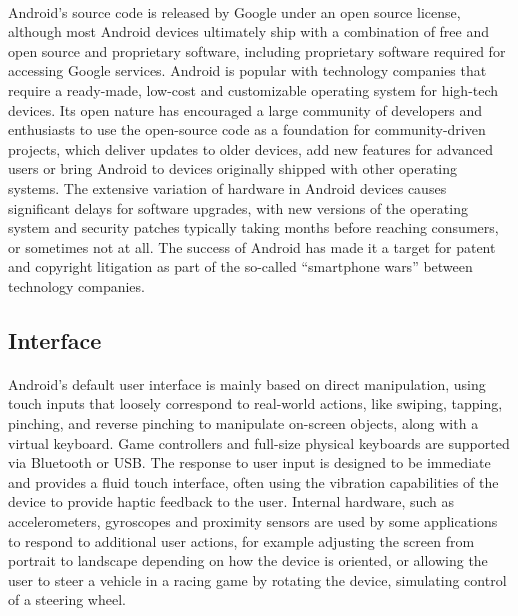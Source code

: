 \documentclass[a4paper,12pt]{report}
\begin{document}
\paragraph{} Android's source code is released by Google under an open source license, although most Android devices ultimately ship with a combination of free and open source and proprietary software, including proprietary software required for accessing Google services. Android is popular with technology companies that require a ready-made, low-cost and customizable operating system for high-tech devices. Its open nature has encouraged a large community of developers and enthusiasts to use the open-source code as a foundation for community-driven projects, which deliver updates to older devices, add new features for advanced users or bring Android to devices originally shipped with other operating systems. The extensive variation of hardware in Android devices causes significant delays for software upgrades, with new versions of the operating system and security patches typically taking months before reaching consumers, or sometimes not at all. The success of Android has made it a target for patent and copyright litigation as part of the so-called ``smartphone wars'' between technology companies.
\subsection{Interface}
\paragraph{}Android's default user interface is mainly based on direct manipulation, using touch inputs that loosely correspond to real-world actions, like swiping, tapping, pinching, and reverse pinching to manipulate on-screen objects, along with a virtual keyboard. Game controllers and full-size physical keyboards are supported via Bluetooth or USB. The response to user input is designed to be immediate and provides a fluid touch interface, often using the vibration capabilities of the device to provide haptic feedback to the user. Internal hardware, such as accelerometers, gyroscopes and proximity sensors are used by some applications to respond to additional user actions, for example adjusting the screen from portrait to landscape depending on how the device is oriented, or allowing the user to steer a vehicle in a racing game by rotating the device, simulating control of a steering wheel.
\end{document}
